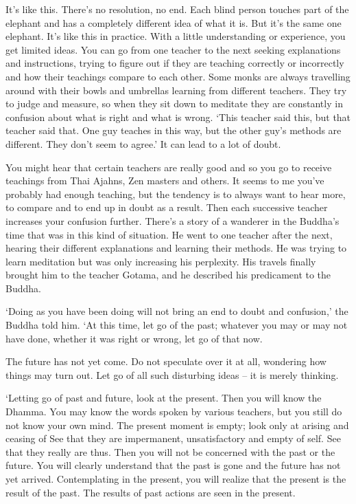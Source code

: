 It's like this. There's no resolution, no end. Each blind person touches part of the elephant and has a completely different idea of what it is. But it's the same one elephant. It's like this in practice. With a little understanding or experience, you get limited ideas. You can go from one teacher to the next seeking explanations and instructions, trying to figure out if they are teaching correctly or incorrectly and how their teachings compare to each other. Some monks are always travelling around with their bowls and umbrellas learning from different teachers. They try to judge and measure, so when they sit down to meditate they are constantly in confusion about what is right and what is wrong. `This teacher said this, but that teacher said that. One guy teaches in this way, but the other guy's methods are different. They don't seem to agree.' It can lead to a lot of doubt.

You might hear that certain teachers are really good and so you go to receive teachings from Thai Ajahns, Zen masters and others. It seems to me you've probably had enough teaching, but the tendency is to always want to hear more, to compare and to end up in doubt as a result. Then each successive teacher increases your confusion further. There's a story of a wanderer in the Buddha's time that was in this kind of situation. He went to one teacher after the next, hearing their different explanations and learning their methods. He was trying to learn meditation but was only increasing his perplexity. His travels finally brought him to the teacher Gotama, and he described his predicament to the Buddha.

`Doing as you have been doing will not bring an end to doubt and confusion,' the Buddha told him. `At this time, let go of the past; whatever you may or may not have done, whether it was right or wrong, let go of that now.

The future has not yet come. Do not speculate over it at all, wondering how things may turn out. Let go of all such disturbing ideas -- it is merely thinking.

`Letting go of past and future, look at the present. Then you will know the Dhamma. You may know the words spoken by various teachers, but you still do not know your own mind. The present moment is empty; look only at arising and ceasing of  See that they are impermanent, unsatisfactory and empty of self. See that they really are thus. Then you will not be concerned with the past or the future. You will clearly understand that the past is gone and the future has not yet arrived. Contemplating in the present, you will realize that the present is the result of the past. The results of past actions are seen in the present.

